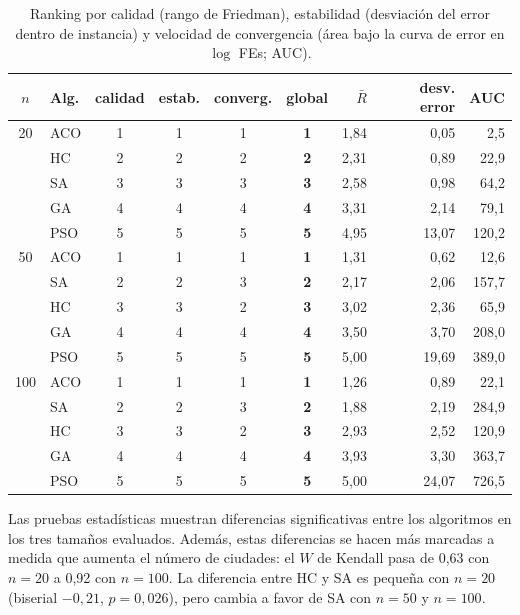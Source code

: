 \documentclass[10pt,a4paper]{article}
\begin{document}
\begin{table}[H]\centering\small
\begin{tabular}{clccccrrr}
\toprule
$n$ & Alg. & calidad & estab. & converg. & global & $\bar R$ & desv. error & AUC \\
\midrule
20 & ACO & 1 & 1 & 1 & \textbf{1} & 1{,}84 & 0{,}05 & 2{,}5 \\
 & HC & 2 & 2 & 2 & \textbf{2} & 2{,}31 & 0{,}89 & 22{,}9 \\
 & SA & 3 & 3 & 3 & \textbf{3} & 2{,}58 & 0{,}98 & 64{,}2 \\
 & GA & 4 & 4 & 4 & \textbf{4} & 3{,}31 & 2{,}14 & 79{,}1 \\
 & PSO & 5 & 5 & 5 & \textbf{5} & 4{,}95 & 13{,}07 & 120{,}2 \\
\midrule
50 & ACO & 1 & 1 & 1 & \textbf{1} & 1{,}31 & 0{,}62 & 12{,}6 \\
 & SA & 2 & 2 & 3 & \textbf{2} & 2{,}17 & 2{,}06 & 157{,}7 \\
 & HC & 3 & 3 & 2 & \textbf{3} & 3{,}02 & 2{,}36 & 65{,}9 \\
 & GA & 4 & 4 & 4 & \textbf{4} & 3{,}50 & 3{,}70 & 208{,}0 \\
 & PSO & 5 & 5 & 5 & \textbf{5} & 5{,}00 & 19{,}69 & 389{,}0 \\
\midrule
100 & ACO & 1 & 1 & 1 & \textbf{1} & 1{,}26 & 0{,}89 & 22{,}1 \\
 & SA & 2 & 2 & 3 & \textbf{2} & 1{,}88 & 2{,}19 & 284{,}9 \\
 & HC & 3 & 3 & 2 & \textbf{3} & 2{,}93 & 2{,}52 & 120{,}9 \\
 & GA & 4 & 4 & 4 & \textbf{4} & 3{,}93 & 3{,}30 & 363{,}7 \\
 & PSO & 5 & 5 & 5 & \textbf{5} & 5{,}00 & 24{,}07 & 726{,}5 \\
\bottomrule
\end{tabular}

\caption{Ranking por calidad (rango de Friedman), estabilidad (desviación del error dentro de instancia) y velocidad de convergencia (área bajo la curva de error en $\log$ FEs; AUC).}\label{tab:rank}
\end{table}
Las pruebas estadísticas muestran diferencias significativas entre los algoritmos en los tres tamaños evaluados. Además, estas diferencias se hacen más marcadas a medida que aumenta el número de ciudades: el $W$ de Kendall pasa de 0{,}63 con $n=20$ a 0{,}92 con $n=100$.
La diferencia entre HC y SA es pequeña con $n=20$ (biserial $-0{,}21$, $p=0{,}026$), pero cambia a favor de SA con $n=50$ y $n=100$.
\end{document}
